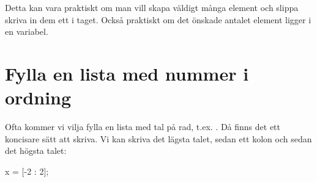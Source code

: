Detta kan vara praktiskt om man vill skapa väldigt många element och slippa skriva in dem ett i taget. Också praktiskt om det önskade antalet element ligger i en variabel.











\section{Fylla en lista med nummer i ordning}\label{subsec:filllist}

Ofta kommer vi vilja fylla en lista med tal på rad, t.ex. \cw{[-2 -1 0 1 2]}. Då finns det ett koncisare sätt att skriva. Vi kan skriva det lägsta talet, sedan ett kolon \cw{:} och sedan det högsta talet:
\begin{matlab}[caption={Skapa en lista som innehåller alla heltal från -2 till 2},label={}]
x = [-2 : 2];
\end{matlab}

